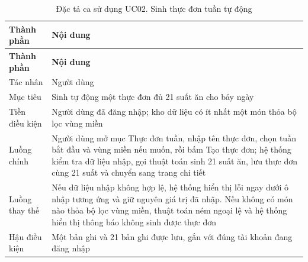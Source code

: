 
\begin{longtable}{|P{3.4cm}|P{10.6cm}|}
\caption{Đặc tả ca sử dụng UC02. Sinh thực đơn tuần tự động}
\label{tab:uc02}\\
\hline
\bfseries Thành phần & \bfseries Nội dung \\ \hline
\endfirsthead
\hline
\bfseries Thành phần & \bfseries Nội dung \\ \hline
\endhead
\endfoot
Tác nhân & Người dùng \\ \hline
Mục tiêu & Sinh tự động một thực đơn đủ 21 suất ăn cho bảy ngày \\ \hline
Tiền điều kiện & Người dùng đã đăng nhập; kho dữ liệu có ít nhất một món thỏa bộ
  lọc vùng miền \\ \hline
Luồng chính & Người dùng mở mục Thực đơn tuần, nhập tên thực đơn, chọn tuần bắt
  đầu và vùng miền nếu muốn, rồi bấm Tạo thực đơn; hệ thống kiểm tra dữ liệu
  nhập, gọi thuật toán sinh 21 suất ăn, lưu thực đơn cùng 21 suất và chuyển sang
  trang chi tiết \\ \hline
Luồng thay thế & Nếu dữ liệu nhập không hợp lệ, hệ thống hiển thị lỗi ngay dưới
  ô nhập tương ứng và giữ nguyên giá trị đã nhập. Nếu không có món nào thỏa bộ
  lọc vùng miền, thuật toán ném ngoại lệ và hệ thống hiển thị thông báo không
  sinh được thực đơn \\ \hline
Hậu điều kiện & Một bản ghi  và 21 bản ghi 
  được lưu, gắn với đúng tài khoản đang đăng nhập \\ \hline
\end{longtable}


